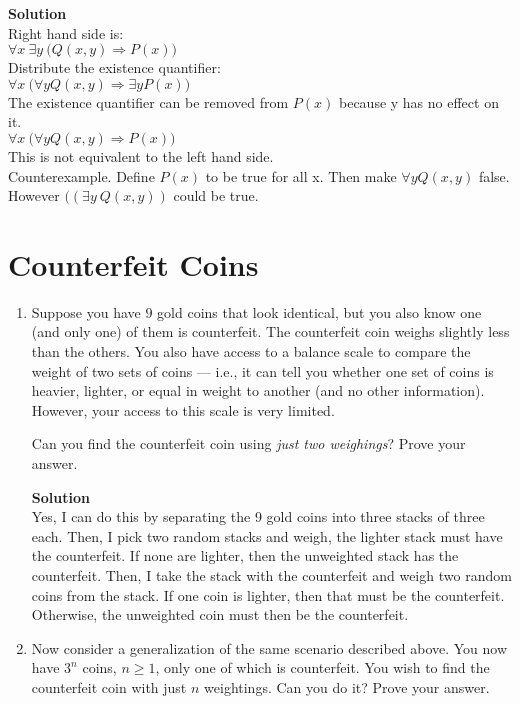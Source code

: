 \documentclass[11pt]{article}
\newcommand*{\Question}[1]{\vfill\pagebreak[3]\section{#1}}
\newenvironment{Parts}{\begin{enumerate}[label=(\alph*)]}{\end{enumerate}}
\newcommand*{\Part}{\item}
\begin{document}
\begin{Parts}
\begin{mdframed} \textbf{Solution} \\
Right hand side is: \\
$\forall x~\exists y~\big(Q(x,y)\Rightarrow P(x)\big)$ \\
Distribute the existence quantifier: \\
$\forall x~ \big(\forall y Q(x,y)\Rightarrow \exists y P(x)\big)$ \\
The existence quantifier can be removed from $P(x)$ because y has no effect on it. \\
$\forall x~ \big(\forall y Q(x,y)\Rightarrow P(x)\big)$ \\
This is not equivalent to the left hand side. \\
Counterexample. Define $P(x)$ to be true for all x. Then make $\forall y Q(x,y)$ false. However $((\exists y~Q(x,y))$ could be true.
\end{mdframed}

\end{Parts}


\Question{Counterfeit Coins}

\begin{Parts}

\Part
Suppose you have $9$ gold coins that look identical, but you also know
one (and only one)
of them is counterfeit. The counterfeit coin weighs slightly less
than the others. You also have access to a balance scale to compare
the weight of two sets of coins --- i.e., it can tell you whether
one set of coins is heavier, lighter, or equal in weight to another
(and no other information). However, your access to this scale is
very limited.

Can you find the counterfeit coin using {\em just two weighings}?
Prove your answer.

\begin{mdframed} \textbf{Solution} \\
Yes, I can do this by separating the 9 gold coins into three stacks of three each. Then, I pick two random stacks and weigh, the lighter stack must have the counterfeit. If none are lighter, then the unweighted stack has the counterfeit. Then, I take the stack with the counterfeit and weigh two random coins from the stack. If one coin is lighter, then that must be the counterfeit. Otherwise, the unweighted coin must then be the counterfeit. 
\end{mdframed}

\Part
Now consider a generalization of the same scenario described above.
You now have $3^n$ coins, $n \geq 1$, only one of which is counterfeit.
You wish to find the counterfeit coin with just $n$ weightings.
Can you do it? Prove your answer.

\end{Parts}
\end{document}
